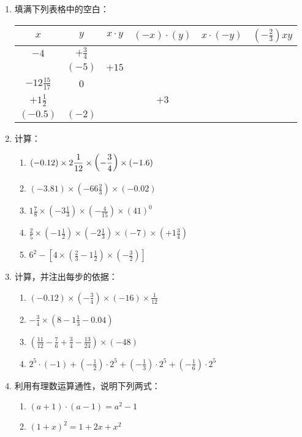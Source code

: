 \begin{enumerate}
\item 填满下列表格中的空白：
\begin{center}
    \begin{tabular}{c|c|c|c|c|c}
    \hline
    $x$  &  $y$  &  $x\cdot y$  &  $(-x)\cdot (y)$  &     $x\cdot (-y)$  &  $\left(-\frac{2}{3}\right)xy$\\
    \hline
    $-4$ & $+\frac{3}{4}$ &&&&\\
& $(-5)$ & $+15$ &&& \\
$-12\frac{15}{17}$ & 0&&&&\\
$+1\frac{1}{2}$ & & & $+3$&&\\
$(-0.5)$ & $(-2)$ &&&&\\
    \hline
    \end{tabular}    
    \end{center}

\item 计算：
\begin{enumerate}
    \item $(-0.12)\times 2\dfrac{1}{12}\times\left(-\dfrac{3}{4}\right)\times(-1.6)$
 \item $(-3.81) \times\left(-66 \frac{2}{3}\right) \times(-0.02)$
\item $1 \frac{7}{8} \times\left(-3 \frac{1}{3}\right) \times\left(-\frac{4}{15}\right) \times(41)^{0}$
\item $\frac{2}{5} \times\left(-1 \frac{1}{2}\right) \times\left(-2 \frac{1}{3}\right) \times(-7) \times\left(+1 \frac{3}{4}\right)$
\item  $6^{2}-\left[4 \times\left(\frac{2}{3}-1 \frac{1}{2}\right) \times\left(-\frac{3}{2}\right)\right]$
\end{enumerate}


\item 计算，并注出每步的依据：
\begin{enumerate}
\item $(-0.12) \times\left(-\frac{3}{4}\right) \times(-16) \times \frac{1}{12}$
\item $-\frac{3}{4} \times\left(8-1 \frac{1}{3}-0.04\right)$
\item $\left(\frac{11}{12}-\frac{7}{6}+\frac{3}{4}-\frac{13}{24}\right) \times(-48)$
\item $2^{5} \cdot(-1)+\left(-\frac{1}{2}\right) \cdot 2^{5}+\left(-\frac{1}{3}\right) \cdot 2^{5}+\left(-\frac{1}{6}\right) \cdot 2^{5}$
\end{enumerate}

\item 利用有理数运算通性，说明下列两式：
\begin{enumerate}
    \item $(a + 1)\cdot (a-1) =a^2-1$
    \item $(1+ x)^2=1+2x+x^2$
\end{enumerate}


\end{enumerate}
